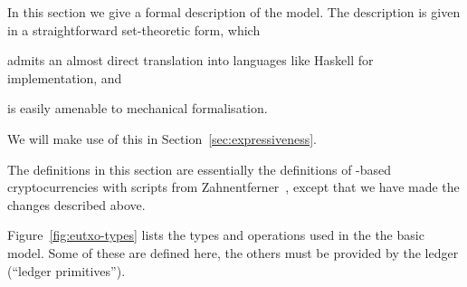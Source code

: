In this section we give a formal description of the \EUTXO{} model.  The
description is given in a straightforward set-theoretic form, which
\begin{inparaenum}[(1)]
\item admits an almost direct translation into languages like Haskell for implementation, and
\item is easily amenable to mechanical formalisation.
\end{inparaenum}
We will make use of this in Section~\ref{sec:expressiveness}.

The definitions in this section are essentially the definitions of
\UTXO{}-based cryptocurrencies with scripts from
Zahnentferner~\cite{Zahnentferner18-UTxO}, except that we have made the changes
described above.

Figure~\ref{fig:eutxo-types} lists the types and operations used in the
the basic \EUTXO{} model. Some of these are defined here, the others must be provided by
the ledger (``ledger primitives'').
